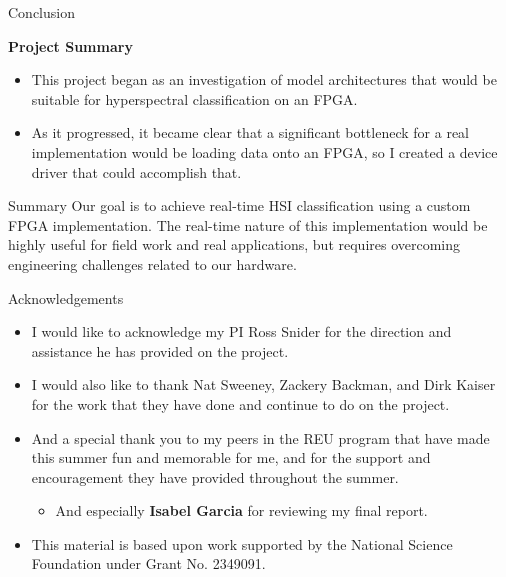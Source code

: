 \documentclass[aspectratio=169,xcolor=dvipsnames]{beamer}
\newcommand\myheading[1]{%
  \par\bigskip
  {\Large\bfseries#1}\par\smallskip}
\begin{document}
\begin{frame}{Conclusion}
    \myheading{Project Summary}
    \begin{itemize}
        \item This project began as an investigation of model architectures that would be suitable for hyperspectral classification on an FPGA.
        \item As it progressed, it became clear that a significant bottleneck for a real implementation would be loading data onto an FPGA, so I created a device driver that could accomplish that.
    \end{itemize}


    \begin{block}{Summary}
        Our goal is to achieve real-time HSI classification using a custom FPGA implementation. The real-time nature of this implementation would be highly useful for field work and real applications, but requires overcoming engineering challenges related to our hardware.
    \end{block}
\end{frame}


\begin{frame}{Acknowledgements}
    \begin{itemize}
        \item I would like to acknowledge my PI Ross Snider for the direction and assistance he has provided on the project.
        \item I would also like to thank Nat Sweeney, Zackery Backman, and Dirk Kaiser for the work that they have done and continue to do on the project.
        \item And a special thank you to my peers in the REU program that have made this summer fun and memorable for me, and for the support and encouragement they have provided throughout the summer.
        \begin{itemize}
            \item And especially \textbf{Isabel Garcia} for reviewing my final report.
        \end{itemize}
        \scriptsize
        \item This material is based upon work supported by the National Science Foundation under Grant No. 2349091.
    \end{itemize}
\end{frame}
\end{document}
